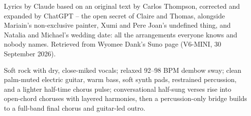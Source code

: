 
\begin{notes}
Lyrics by Claude based on an original text by Carlos Thompson, corrected and expanded by ChatGPT -- the open secret of Claire and Thomas, alongside Mariain's non-exclusive painter, Xumi and Pere Joan's undefined thing, and Natalia and Michael's wedding date: all the arrangements everyone knows and nobody names. Retrieved from Wyomee Dank's Suno page (V6-MINI, 30 September 2026).
\end{notes}
\begin{style}
Soft rock with dry, close-miked vocals; relaxed 92--98 BPM dembow sway; clean palm-muted electric guitar, warm bass, soft synth pads, restrained percussion, and a lighter half-time chorus pulse; conversational half-sung verses rise into open-chord choruses with layered harmonies, then a percussion-only bridge builds to a full-band final chorus and guitar-led outro.
\end{style}
